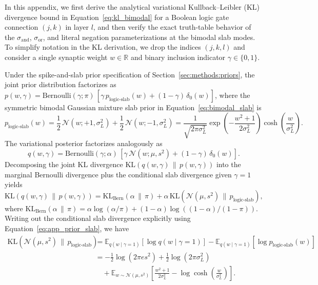 \documentclass[11pt,a4paper]{article}
\begin{document}
In this appendix, we first derive the analytical variational Kullback--Leibler (KL) divergence bound in Equation~\eqref{eq:kl_bimodal} for a Boolean logic gate connection $(j, k)$ in layer $l$, and then verify the exact truth-table behavior of the $\sigma_{\text{and}}$, $\sigma_{\text{or}}$, and literal negation parameterizations at the bimodal slab modes. To simplify notation in the KL derivation, we drop the indices $(j, k, l)$ and consider a single synaptic weight $w \in \mathbb{R}$ and binary inclusion indicator $\gamma \in \{0, 1\}$.

Under the spike-and-slab prior specification of Section~\ref{sec:methods:priors}, the joint prior distribution factorizes as $p(w, \gamma) = \mathrm{Bernoulli}(\gamma; \pi)\,\left[\gamma\,p_{\text{logic-slab}}(w) + (1 - \gamma)\,\delta_0(w)\right]$, where the symmetric bimodal Gaussian mixture slab prior in Equation~\eqref{eq:bimodal_slab} is
\begin{equation}
\label{eq:app_prior_slab}
p_{\text{logic-slab}}(w) = \frac{1}{2}\,\mathcal{N}\!\left(w; +1, \sigma_L^2\right) + \frac{1}{2}\,\mathcal{N}\!\left(w; -1, \sigma_L^2\right) = \frac{1}{\sqrt{2\pi\sigma_L^2}} \exp\!\left(-\frac{w^2 + 1}{2\sigma_L^2}\right) \cosh\!\left(\frac{w}{\sigma_L^2}\right).
\end{equation}
The variational posterior factorizes analogously as
\begin{equation*}
q(w, \gamma) = \mathrm{Bernoulli}(\gamma; \alpha)\,\left[\gamma\,\mathcal{N}(w; \mu, s^2) + (1 - \gamma)\,\delta_0(w)\right].
\end{equation*}
Decomposing the joint KL divergence $\mathrm{KL}(q(w, \gamma) \,\|\, p(w, \gamma))$ into the marginal Bernoulli divergence plus the conditional slab divergence given $\gamma = 1$ yields
\begin{equation}
\label{eq:app_kl_decomp}
\mathrm{KL}\!\left(q(w, \gamma) \,\|\, p(w, \gamma)\right) = \mathrm{KL}_{\text{Bern}}(\alpha \,\|\, \pi) + \alpha\,\mathrm{KL}\!\left(\mathcal{N}(\mu, s^2) \,\|\, p_{\text{logic-slab}}\right),
\end{equation}
where $\mathrm{KL}_{\text{Bern}}(\alpha \,\|\, \pi) = \alpha\log(\alpha/\pi) + (1-\alpha)\log((1-\alpha)/(1-\pi))$. Writing out the conditional slab divergence explicitly using Equation~\eqref{eq:app_prior_slab}, we have
\begin{equation}
\label{eq:app_slab_expand}
\begin{aligned}
\mathrm{KL}\!\left(\mathcal{N}(\mu, s^2) \,\|\, p_{\text{logic-slab}}\right) &= \mathbb{E}_{q(w \mid \gamma=1)}\!\left[\log q(w \mid \gamma=1)\right] - \mathbb{E}_{q(w \mid \gamma=1)}\!\left[\log p_{\text{logic-slab}}(w)\right] \\
&= -\frac{1}{2}\log\!\left(2\pi e s^2\right) + \frac{1}{2}\log\!\left(2\pi\sigma_L^2\right) \\
&\quad + \mathbb{E}_{w \sim \mathcal{N}(\mu, s^2)}\!\left[\frac{w^2 + 1}{2\sigma_L^2} - \log\cosh\!\left(\frac{w}{\sigma_L^2}\right)\right].
\end{aligned}
\end{equation}
\end{document}
